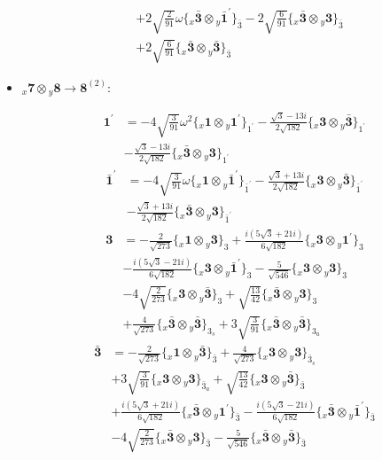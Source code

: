 \documentclass[english]{article}
\newcommand{\rep}[1]{\mathbf{#1}}
\newcommand{\repx}[2]{{}_{#2}\mathbf{#1}}
\newcommand{\tsprodx}[2]{\repx{#1}{x}\otimes\repx{#2}{y}}
\newcommand{\subcgt}[3]{\big\{ \tsprodx{#1}{#2}\big\}^{}_{#3}}
\begin{document}
\begin{itemize}
\begin{fleqn}
\begin{align*}
 & +2 \sqrt{\frac{2}{91}} \omega\subcgt{\bar{3}}{\bar{1}^{\prime}}{\bar{3}}-2 \sqrt{\frac{6}{91}}\subcgt{\bar{3}}{3}{\bar{3}} \\ 
 & +2 \sqrt{\frac{6}{91}}\subcgt{\bar{3}}{\bar{3}}{\bar{3}}
\end{align*}
\end{fleqn}
\item $\tsprodx{7}{8}\to\rep{8}^{(2)}$:
\begin{fleqn}
\begin{align*}
\rep{1^{\prime}} & = -4 \sqrt{\frac{3}{91}} \omega ^2\subcgt{1}{1^{\prime}}{1^{\prime}}-\frac{\sqrt{3}-13 i}{2 \sqrt{182}}\subcgt{3}{\bar{3}}{1^{\prime}} \\ 
 & -\frac{\sqrt{3}-13 i}{2 \sqrt{182}}\subcgt{\bar{3}}{3}{1^{\prime}}
\end{align*}
\begin{align*}
\rep{\bar{1}^{\prime}} & = -4 \sqrt{\frac{3}{91}} \omega\subcgt{1}{\bar{1}^{\prime}}{\bar{1}^{\prime}}-\frac{\sqrt{3}+13 i}{2 \sqrt{182}}\subcgt{3}{\bar{3}}{\bar{1}^{\prime}} \\ 
 & -\frac{\sqrt{3}+13 i}{2 \sqrt{182}}\subcgt{\bar{3}}{3}{\bar{1}^{\prime}}
\end{align*}
\begin{align*}
\rep{3} & = -\frac{2}{\sqrt{273}}\subcgt{1}{3}{3}+\frac{i \left(5 \sqrt{3}+21 i\right)}{6 \sqrt{182}}\subcgt{3}{1^{\prime}}{3} \\ 
 & -\frac{i \left(5 \sqrt{3}-21 i\right)}{6 \sqrt{182}}\subcgt{3}{\bar{1}^{\prime}}{3}-\frac{5}{\sqrt{546}}\subcgt{3}{3}{3} \\ 
 & -4 \sqrt{\frac{2}{273}}\subcgt{3}{\bar{3}}{3}+\sqrt{\frac{13}{42}}\subcgt{\bar{3}}{3}{3} \\ 
 & +\frac{4}{\sqrt{273}}\subcgt{\bar{3}}{\bar{3}}{3_{s}}+3 \sqrt{\frac{3}{91}}\subcgt{\bar{3}}{\bar{3}}{3_{a}}
\end{align*}
\begin{align*}
\rep{\bar{3}} & = -\frac{2}{\sqrt{273}}\subcgt{1}{\bar{3}}{\bar{3}}+\frac{4}{\sqrt{273}}\subcgt{3}{3}{\bar{3}_{s}} \\ 
 & +3 \sqrt{\frac{3}{91}}\subcgt{3}{3}{\bar{3}_{a}}+\sqrt{\frac{13}{42}}\subcgt{3}{\bar{3}}{\bar{3}} \\ 
 & +\frac{i \left(5 \sqrt{3}+21 i\right)}{6 \sqrt{182}}\subcgt{\bar{3}}{1^{\prime}}{\bar{3}}-\frac{i \left(5 \sqrt{3}-21 i\right)}{6 \sqrt{182}}\subcgt{\bar{3}}{\bar{1}^{\prime}}{\bar{3}} \\ 
 & -4 \sqrt{\frac{2}{273}}\subcgt{\bar{3}}{3}{\bar{3}}-\frac{5}{\sqrt{546}}\subcgt{\bar{3}}{\bar{3}}{\bar{3}}

\end{align*}
\end{fleqn}
\end{itemize}
\end{document}

